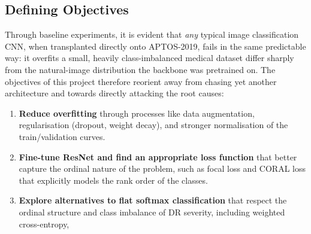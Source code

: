 \subsection{Defining Objectives}
Through baseline experiments, it is evident that \emph{any} typical image classification CNN, when transplanted directly onto APTOS-2019, fails in the same predictable way: it overfits a small, heavily class-imbalanced medical dataset differ sharply from the natural-image distribution the backbone was pretrained on. The objectives of this project therefore reorient away from chasing yet another architecture and towards directly attacking the root causes:
\begin{enumerate}
    \item \textbf{Reduce overfitting} through processes like data augmentation, regularisation (dropout, weight decay), and stronger normalisation of the train/validation curves.
    \item \textbf{Fine-tune ResNet and find an appropriate loss function} that better capture the ordinal nature of the problem, such as focal loss and CORAL loss that explicitly models the rank order of the classes.
    \item \textbf{Explore alternatives to flat softmax classification} that respect the ordinal structure and class imbalance of DR severity, including weighted cross-entropy,
\end{enumerate}
